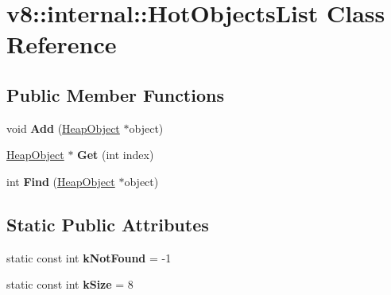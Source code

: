 \hypertarget{classv8_1_1internal_1_1_hot_objects_list}{}\section{v8\+:\+:internal\+:\+:Hot\+Objects\+List Class Reference}
\label{classv8_1_1internal_1_1_hot_objects_list}
\subsection*{Public Member Functions}
\begin{DoxyCompactItemize}
\item 
void {\bfseries Add} (\hyperlink{classv8_1_1internal_1_1_heap_object}{Heap\+Object} $\ast$object)\hypertarget{classv8_1_1internal_1_1_hot_objects_list_ae2e8f66dc659ed64711f40b877562c97}{}\label{classv8_1_1internal_1_1_hot_objects_list_ae2e8f66dc659ed64711f40b877562c97}

\item 
\hyperlink{classv8_1_1internal_1_1_heap_object}{Heap\+Object} $\ast$ {\bfseries Get} (int index)\hypertarget{classv8_1_1internal_1_1_hot_objects_list_aed0128ddec1cbdfd2d07c21426f2abea}{}\label{classv8_1_1internal_1_1_hot_objects_list_aed0128ddec1cbdfd2d07c21426f2abea}

\item 
int {\bfseries Find} (\hyperlink{classv8_1_1internal_1_1_heap_object}{Heap\+Object} $\ast$object)\hypertarget{classv8_1_1internal_1_1_hot_objects_list_ac8b67deab7ff6f601d7c8350455696a1}{}\label{classv8_1_1internal_1_1_hot_objects_list_ac8b67deab7ff6f601d7c8350455696a1}

\end{DoxyCompactItemize}
\subsection*{Static Public Attributes}
\begin{DoxyCompactItemize}
\item 
static const int {\bfseries k\+Not\+Found} = -\/1\hypertarget{classv8_1_1internal_1_1_hot_objects_list_a2d7691ba467e300e60a5b53d7bc93827}{}\label{classv8_1_1internal_1_1_hot_objects_list_a2d7691ba467e300e60a5b53d7bc93827}

\item 
static const int {\bfseries k\+Size} = 8\hypertarget{classv8_1_1internal_1_1_hot_objects_list_ac0fe4a67bfcd04ddaa0e406590c2c942}{}\label{classv8_1_1internal_1_1_hot_objects_list_ac0fe4a67bfcd04ddaa0e406590c2c942}

\end{DoxyCompactItemize}
